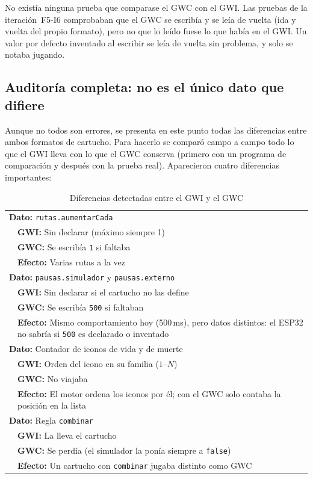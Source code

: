No existía ninguna prueba que comparase el GWC con el GWI. Las pruebas de la iteración~F5-I6 comprobaban que el GWC se escribía y se leía de vuelta (ida y vuelta del propio formato), pero no que lo leído fuese lo que había en el GWI. Un valor por defecto inventado al escribir se leía de vuelta sin problema, y solo se notaba jugando.

\subsection{Auditoría completa: no es el único dato que difiere}
\label{sec:F5I13Auditoria}

Aunque no todos son errores, se presenta en este punto todas las diferencias entre ambos formatos de cartucho. Para hacerlo se comparó campo a campo todo lo que el GWI lleva con lo que el GWC conserva (primero con un programa de comparación y después con la prueba real). Aparecieron cuatro diferencias importantes:

\begin{table}[htbp]
	\centering
	\begin{tabularx}{\textwidth}{p{0.8cm} >{\RaggedRight\arraybackslash}X}
		\toprule
		\multicolumn{2}{l}{\textbf{Dato:} \texttt{rutas.aumentarCada}} \\
		& \textbf{GWI:} Sin declarar (máximo siempre 1) \\
		& \textbf{GWC:} Se escribía \texttt{1} si faltaba \\
		& \textbf{Efecto:} Varias rutas a la vez \\
		\midrule
		\multicolumn{2}{l}{\textbf{Dato:} \texttt{pausas.simulador} y \texttt{pausas.externo}} \\
		& \textbf{GWI:} Sin declarar si el cartucho no las define \\
		& \textbf{GWC:} Se escribía \texttt{500} si faltaban \\
		& \textbf{Efecto:} Mismo comportamiento hoy (500\,ms), pero datos distintos: el ESP32 no sabría si \texttt{500} es declarado o inventado \\
		\midrule
		\multicolumn{2}{l}{\textbf{Dato:} Contador de iconos de vida y de muerte} \\
		& \textbf{GWI:} Orden del icono en su familia ($1\text{--}N$) \\
		& \textbf{GWC:} No viajaba \\
		& \textbf{Efecto:} El motor ordena los iconos por él; con el GWC solo contaba la posición en la lista \\
		\midrule
		\multicolumn{2}{l}{\textbf{Dato:} Regla \texttt{combinar}} \\
		& \textbf{GWI:} La lleva el cartucho \\
		& \textbf{GWC:} Se perdía (el simulador la ponía siempre a \texttt{false}) \\
		& \textbf{Efecto:} Un cartucho con \texttt{combinar} jugaba distinto como GWC \\
		\bottomrule
	\end{tabularx}
	\caption{Diferencias detectadas entre el GWI y el GWC}
	\label{tab:gwi-gwc-f5-i13}
\end{table}

